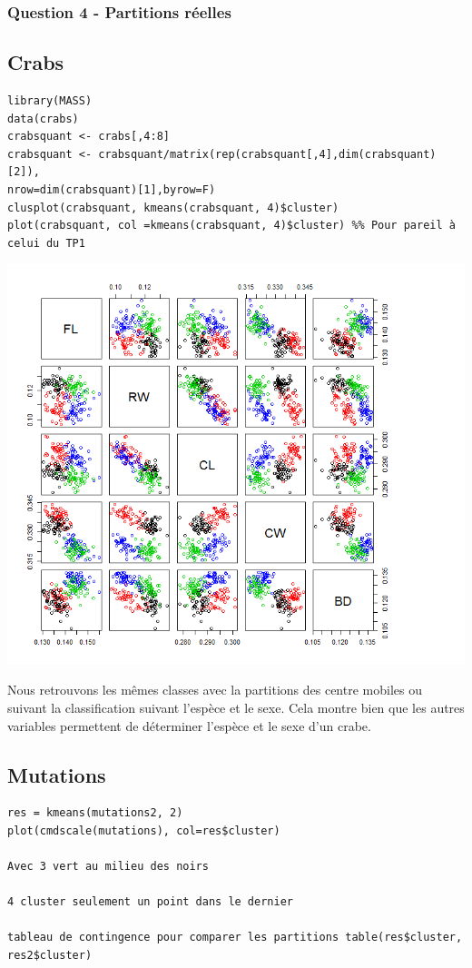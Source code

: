 \documentclass{article}\usepackage[]{graphicx}\usepackage[]{color}
\begin{document}
\subsubsection*{Question 4 - Partitions réelles}


\subsection*{Crabs}
\begin{verbatim}
library(MASS)
data(crabs)
crabsquant <- crabs[,4:8]
crabsquant <- crabsquant/matrix(rep(crabsquant[,4],dim(crabsquant)[2]),
nrow=dim(crabsquant)[1],byrow=F)
clusplot(crabsquant, kmeans(crabsquant, 4)$cluster)
plot(crabsquant, col =kmeans(crabsquant, 4)$cluster) %% Pour pareil à celui du TP1
\end{verbatim}
\includegraphics[width=\textwidth]{ex2.png}

Nous retrouvons les mêmes classes avec la partitions des centre mobiles ou suivant la classification suivant l'espèce et le sexe. Cela montre bien que les autres variables permettent de déterminer l'espèce et le sexe d'un crabe. 

\subsection*{Mutations}
\begin{verbatim}
res = kmeans(mutations2, 2)
plot(cmdscale(mutations), col=res$cluster)

Avec 3 vert au milieu des noirs 

4 cluster seulement un point dans le dernier

tableau de contingence pour comparer les partitions table(res$cluster, res2$cluster)
\end{verbatim}
\end{document}
